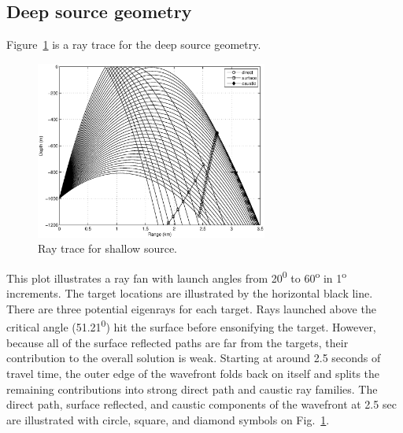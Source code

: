 \documentclass{ws-jca}
\begin{document}
\subsection*{Deep source geometry}

Figure~\ref{fig:pedersen_deep_raytrace} is a ray trace for the deep source
geometry. 
\begin{figure}[th]
	\centerline{\includegraphics[width=3in]{pedersen_deep_raytrace.eps}} 
	\vspace*{8pt}
	\caption{Ray trace for shallow source. 
	\label{fig:pedersen_deep_raytrace}}
\end{figure}
This plot illustrates a ray fan with launch angles from
20\textsuperscript{0} to 60\textsuperscript{o} in 1\textsuperscript{o}
increments. The target locations are illustrated by the horizontal black
line. There are three potential eigenrays for each target. Rays launched
above the critical angle (51.21\textsuperscript{0}) hit the surface before
ensonifying the target. However, because all of the surface reflected paths
are far from the targets, their contribution to the overall solution is
weak. Starting at around 2.5 seconds of travel time, the outer edge of the
wavefront folds back on itself and splits the remaining contributions into
strong direct path and caustic ray families. The direct path, surface
reflected, and caustic components of the wavefront at 2.5 sec are
illustrated with circle, square, and diamond symbols on
Fig.~\ref{fig:pedersen_deep_raytrace}.
\end{document}

